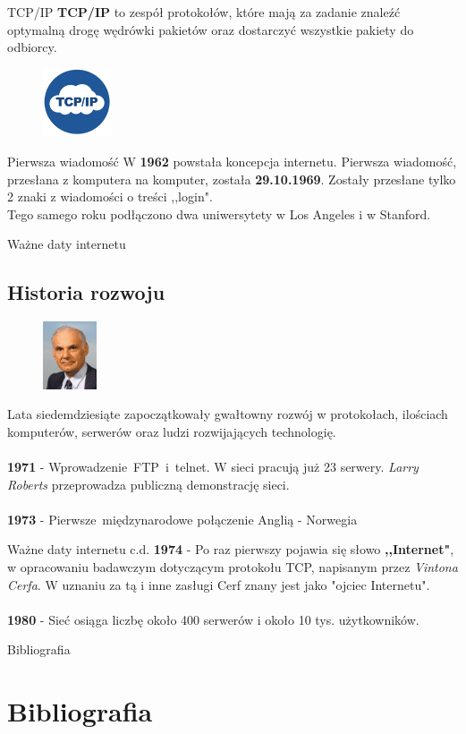\documentclass{beamer}
\begin{document}
	\begin{frame}{TCP/IP}
		\textbf{TCP/IP} to zespół protokołów, które mają za zadanie znaleźć optymalną drogę wędrówki pakietów oraz dostarczyć wszystkie pakiety do odbiorcy.
		\begin{figure}
			\flushright
			\vspace{-30pt}
			\includegraphics[height=2cm]{TCPIPDOC.jpg}
			\nocite{TCPIP}
		\end{figure}
	\end{frame}
	\begin{frame}{Pierwsza wiadomość}
		W \textbf{1962} powstała koncepcja internetu. Pierwsza wiadomość, przesłana z komputera na komputer, została \textbf{29.10.1969}. Zostały przesłane tylko 2 znaki z wiadomości o treści ,,login".\cite{TVN} \\
		Tego samego roku podłączono dwa uniwersytety w Los Angeles i w Stanford. \cite{his:int:prez1}
	\end{frame}
	\begin{frame}{Ważne daty internetu}
		\subsection{Historia rozwoju}
			\begin{figure}
			\flushright
			\includegraphics[height=2cm]{Larry_Roberts.jpg}
		\end{figure}
		Lata siedemdziesiąte zapoczątkowały gwałtowny rozwój w protokołach, ilościach komputerów, serwerów oraz ludzi rozwijających technologię.\\ ~ \\
		\textbf{1971} - Wprowadzenie~FTP~i~telnet. W sieci pracują już 23 serwery.  \emph{Larry Roberts} przeprowadza publiczną demonstrację sieci.\\ ~ \\
		\textbf{1973} - Pierwsze~międzynarodowe połączenie Anglią - Norwegia
	\end{frame}
	\begin{frame}{Ważne daty internetu c.d.}
		\textbf{1974} - Po raz pierwszy pojawia się słowo \textbf{,,Internet"}, w opracowaniu badawczym dotyczącym protokołu TCP, napisanym przez \emph{ Vintona Cerfa}. W uznaniu za tą i inne zasługi Cerf znany jest jako "ojciec Internetu". \\ ~ \\
		\textbf{1980} - Sieć osiąga liczbę około 400 serwerów i około 10 tys. użytkowników.
	\end{frame}

	\begin{frame}{Bibliografia}
	\section{Bibliografia}
	
	\end{frame}
\end{document}

